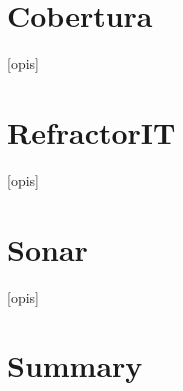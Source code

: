 \section{Cobertura}
[opis]

\section{RefractorIT}
[opis]

\section{Sonar}
[opis]


\section{Summary}

